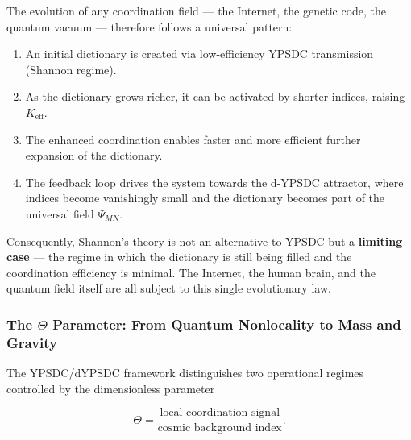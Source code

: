 \documentclass[12pt,a4paper]{article}
\theoremstyle{remark}
\begin{document}
	The evolution of any coordination field --- the Internet, the genetic
	code, the quantum vacuum --- therefore follows a universal pattern:
	\begin{enumerate}[leftmargin=*]
		\item An initial dictionary is created via low-efficiency YPSDC
		transmission (Shannon regime).
		\item As the dictionary grows richer, it can be activated by
		shorter indices, raising $K_{\mathrm{eff}}$.
		\item The enhanced coordination enables faster and more efficient
		further expansion of the dictionary.
		\item The feedback loop drives the system towards the d-YPSDC
		attractor, where indices become vanishingly small and the
		dictionary becomes part of the universal field
		$\Psi_{MN}$.
	\end{enumerate}
	
	Consequently, Shannon's theory is not an alternative to YPSDC but a
	\textbf{limiting case} --- the regime in which the dictionary is still
	being filled and the coordination efficiency is minimal.  The Internet,
	the human brain, and the quantum field itself are all subject to this
	single evolutionary law.
	
	\medskip
	
	\subsubsection{The \(\Theta\) Parameter: From Quantum Nonlocality to Mass and Gravity}
	\label{subsec:theta-mass-gravity}
	
	The YPSDC/dYPSDC framework distinguishes two operational regimes controlled by the dimensionless parameter
	
	\begin{equation}
		\Theta = \frac{\text{local coordination signal}}{\text{cosmic background index}}.
	\end{equation}
	
\end{document}
